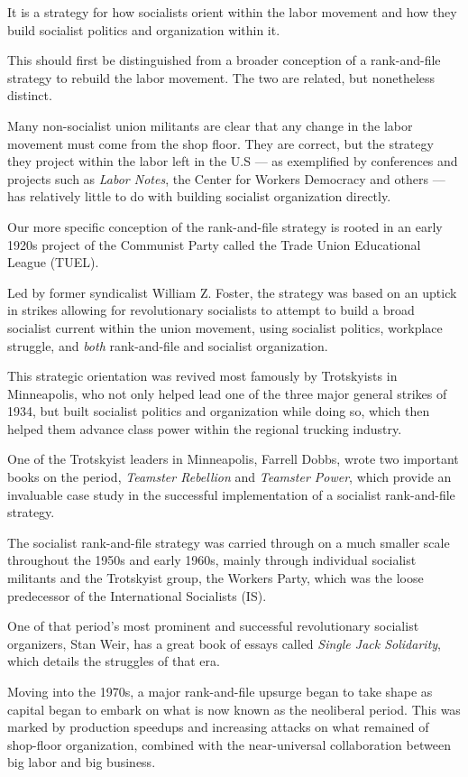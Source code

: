It is a strategy for how socialists orient within the labor movement and how they build socialist politics and organization within it.

This should first be distinguished from a broader conception of a rank-and-file strategy to rebuild the labor movement. The two are related, but nonetheless distinct.

Many non-socialist union militants are clear that any change in the labor movement must come from the shop floor. They are correct, but the strategy they project within the labor left in the U.S — as exemplified by conferences and projects such as \emph{Labor Notes}, the Center for Workers Democracy and others — has relatively little to do with building socialist organization directly.

Our more specific conception of the rank-and-file strategy is rooted in an early 1920s project of the Communist Party called the Trade Union Educational League (TUEL).

Led by former syndicalist William Z. Foster, the strategy was based on an uptick in strikes allowing for revolutionary socialists to attempt to build a broad socialist current within the union movement, using socialist politics, workplace struggle, and \emph{both} rank-and-file and socialist organization.

This strategic orientation was revived most famously by Trotskyists in Minneapolis, who not only helped lead one of the three major general strikes of 1934, but built socialist politics and organization while doing so, which then helped them advance class power within the regional trucking industry.

One of the Trotskyist leaders in Minneapolis, Farrell Dobbs, wrote two important books on the period, \emph{Teamster Rebellion} and \emph{Teamster Power}, which provide an invaluable case study in the successful implementation of a socialist rank-and-file strategy.

The socialist rank-and-file strategy was carried through on a much smaller scale throughout the 1950s and early 1960s, mainly through individual socialist militants and the Trotskyist group, the Workers Party, which was the loose predecessor of the International Socialists (IS).

One of that period’s most prominent and successful revolutionary socialist organizers, Stan Weir, has a great book of essays called \emph{Single Jack Solidarity}, which details the struggles of that era.

Moving into the 1970s, a major rank-and-file upsurge began to take shape as capital began to embark on what is now known as the neoliberal period. This was marked by production speedups and increasing attacks on what remained of shop-floor organization, combined with the near-universal collaboration between big labor and big business.

